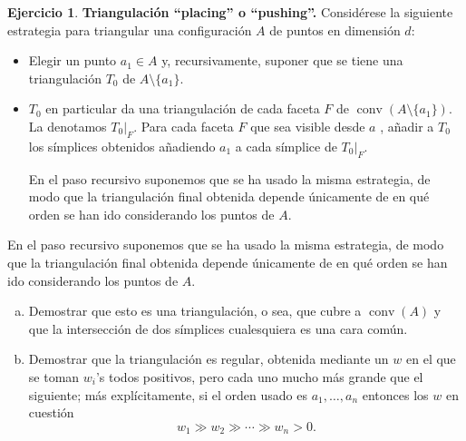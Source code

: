 \documentclass[10pt]{article}
\theoremstyle{definition}
\newtheorem{ejer}{Ejercicio}
\newcommand{\conv}{\operatorname{conv}}
\begin{document}
\begin{ejer}{\bf Triangulación ``placing'' o ``pushing''.}
Considérese la siguiente estrategia para triangular una configuración $A$ de puntos en dimensión $d$:
\begin{itemize}
\item Elegir un punto $a_1\in A$ y, recursivamente, suponer que se tiene una triangulación $T_0$ de $A\setminus \{a_1\}$.

\item $T_0$ en particular da una triangulación de cada faceta $F$ de $\conv(A\setminus \{a_1\})$. La denotamos $T_0|_F$. Para cada faceta $F$ que sea visible desde $a$%
, añadir a $T_0$ los símplices obtenidos añadiendo $a_1$ a cada símplice de $T_0|_F$.

En el paso recursivo suponemos que se ha usado la misma estrategia, de modo que la triangulación final obtenida depende únicamente de en qué orden se han ido considerando los puntos de $A$.
\end{itemize}

En el paso recursivo suponemos que se ha usado la misma estrategia, de modo que la triangulación final obtenida depende únicamente de en qué orden se han ido considerando los puntos de $A$.

\begin{enumerate}[(a)]
\item Demostrar que esto es una triangulación, o sea, que cubre a $\conv(A)$ y que la intersección de dos símplices cualesquiera es una cara común.

\item Demostrar que la triangulación es regular, obtenida mediante un $w$ en el que se toman $w_i$'s todos positivos, pero cada uno mucho más grande que el siguiente; más explícitamente, si el orden usado es $a_1,\ldots,a_n$ entonces los $w$ en cuestión
\[w_1\gg w_2\gg\cdots \gg w_n>0.\]
\end{enumerate}
\end{ejer}
\end{document}
